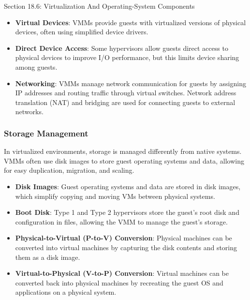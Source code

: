 \begin{notes}{Section 18.6: Virtualization And Operating-System Components}
\begin{highlight}[I/O Management]
        \begin{itemize}
            \item \textbf{Virtual Devices}: VMMs provide guests with virtualized versions of physical devices, often using simplified device drivers.
            \item \textbf{Direct Device Access}: Some hypervisors allow guests direct access to physical devices to improve I/O performance, but this limits device sharing among guests.
            \item \textbf{Networking}: VMMs manage network communication for guests by assigning IP addresses and routing traffic through virtual switches. Network address translation (NAT) and bridging 
            are used for connecting guests to external networks.
        \end{itemize}
    
    \end{highlight}
    
    \subsubsection*{Storage Management}
    
    In virtualized environments, storage is managed differently from native systems. VMMs often use disk images to store guest operating systems and data, allowing for easy duplication, migration, and scaling.
    
    \begin{highlight}
    
        \begin{itemize}
            \item \textbf{Disk Images}: Guest operating systems and data are stored in disk images, which simplify copying and moving VMs between physical systems.
            \item \textbf{Boot Disk}: Type 1 and Type 2 hypervisors store the guest's root disk and configuration in files, allowing the VMM to manage the guest's storage.
            \item \textbf{Physical-to-Virtual (P-to-V) Conversion}: Physical machines can be converted into virtual machines by capturing the disk contents and storing them as a disk image.
            \item \textbf{Virtual-to-Physical (V-to-P) Conversion}: Virtual machines can be converted back into physical machines by recreating the guest OS and applications on a physical system.
        \end{itemize}
    

\end{highlight}
\end{notes}
